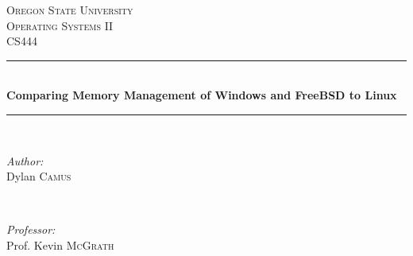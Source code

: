 \documentclass[journal,letterpaper,draftclsnofoot,onecolumn,10pt]{IEEEtran}
\begin{document}
\begin{titlepage}

\newcommand{\HRule}{\rule{\linewidth}{0.5mm}} %

\center %
 

\textsc{\LARGE Oregon State University}\\[1.5cm] %
\textsc{\Large Operating Systems II}\\[0.5cm] %
\textsc{\large CS444}\\[0.5cm] %


\HRule \\[0.4cm]
{ \huge \bfseries Comparing Memory Management of Windows and FreeBSD to Linux}\\[0.4cm] %
\HRule \\[1.5cm]
 

\begin{minipage}{0.4\textwidth}
   \begin{flushleft} \large
      \emph{Author:}\\
      Dylan \textsc{Camus} %
   \end{flushleft}
\end{minipage}
~
\begin{minipage}{0.4\textwidth}
   \begin{flushright} \large
      \emph{Professor:} \\
      Prof. Kevin \textsc{McGrath} %
   \end{flushright}
\end{minipage}\\[4cm]



\end{titlepage}
\end{document}
